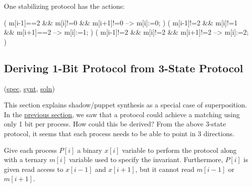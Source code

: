 One stabilizing protocol has the actions:
\begin{code}
( m[i-1]==2 && m[i]!=0 && m[i+1]!=0 --> m[i]:=0; )
( m[i-1]!=2 && m[i]!=1 && m[i+1]==2 --> m[i]:=1; )
( m[i-1]!=2 && m[i]!=2 && m[i+1]!=2 --> m[i]:=2; )
\end{code}

\subsection{Deriving 1-Bit Protocol from 3-State Protocol}
\label{sec:MatchRingOneBit}

(\href{\examplespec/MatchRingOneBit.prot}{spec},
\href{\examplesynt/MatchRingOneBit.prot}{synt},
\href{\examplesoln/MatchRingOneBit.prot}{soln})

This section explains shadow/puppet synthesis as a special case of superposition.
In the \href{#sec:MatchRing}{previous section}, we saw that a protocol could achieve a matching using only 1 bit per process.
How could this be derived?
From the above 3-state protocol, it seems that each process needs to be able to point in $3$ directions.

Give each process $P[i]$ a binary $x[i]$ variable to perform the protocol along with a ternary $m[i]$ variable used to specify the invariant.
Furthermore, $P[i]$ is given read access to $x[i-1]$ and $x[i+1]$, but it cannot read $m[i-1]$ or $m[i+1]$.

